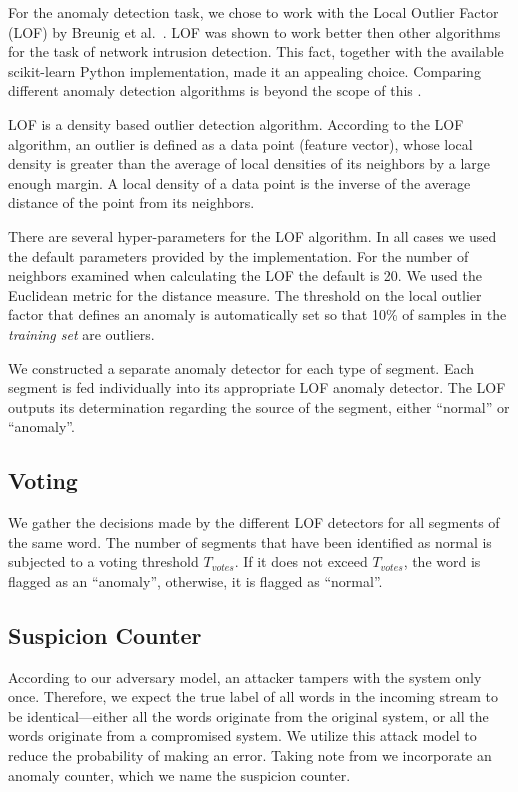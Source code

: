 \documentclass[compsoc,conference,a4paper,10pt,times]{IEEEtran}
\newcommand{\sublevel}[1]{\subsection{#1}}
\newcommand{\sublevel}[1]{\section{#1}}
\begin{document}
  For the anomaly detection task, we chose to work with the Local Outlier Factor (LOF) by Breunig et al.\ \cite{breunig2000lof}. LOF was shown to work better then other algorithms for the task of network intrusion detection\cite{lazarevic2003comparative}. This fact, together with the available scikit-learn \cite{scikit-learn} Python implementation, made it an appealing choice. Comparing different anomaly detection algorithms is beyond the scope of this \iftoggle{paper} {paper} {work}.
  
  LOF is a density based outlier detection algorithm. According to the LOF algorithm, an outlier is defined as a data point (feature vector), whose local density is greater than the average of local densities of its neighbors by a large enough margin. A local density of a data point is the inverse of the average distance of the point from its neighbors.
  
  There are several hyper-parameters for the LOF algorithm. In all cases we used the default parameters provided by the implementation. For the number of neighbors examined when calculating the LOF the default is 20. We used the Euclidean metric for the distance measure. The threshold on the local outlier factor that defines an anomaly is automatically set so that 10\% of samples in the \textit{training set} are outliers.
  
  We constructed a separate anomaly detector for each type of segment. Each segment is fed individually into its appropriate LOF anomaly detector. The LOF outputs its determination regarding the source of the segment, either ``normal'' or ``anomaly''.
  
\sublevel{Voting}
  We gather the decisions made by the different LOF detectors for all segments of the same word. The number of segments that have been identified as normal is subjected to a voting threshold $T_{votes}$. If it does not exceed $T_{votes}$, the word is flagged as an ``anomaly'', otherwise, it is flagged as ``normal''.
  
\sublevel{Suspicion Counter}
  According to our adversary model, an attacker tampers with the system only once. Therefore, we expect the true label of all words in the incoming stream to be identical---either all the words originate from the original system, or all the words originate from a compromised system. We utilize this attack model to reduce the probability of making an error. Taking note from \cite{kneib2018scission} we incorporate an anomaly counter, which we name the suspicion counter.
  
\end{document}
